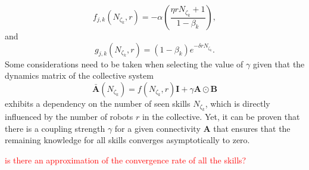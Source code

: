\begin{equation}\label{eq:f_function_collective}
	f_{j,k}\left(N_{\zeta_k},r\right) = -\alpha \left( \frac{\eta r N_{\zeta_k} + 1}{1 - \beta_k} \right),
\end{equation}
and
\begin{equation}\label{eq:g_function_collective}
	g_{j,k}\left(N_{\zeta_k},r\right) = (1-\beta_k) e^{-\delta r N_{\zeta_k}}.
\end{equation}
Some considerations need to be taken when selecting the value of $\gamma$ given that the dynamics matrix of the collective system
\begin{equation}
	\bar{\bm{A}}\left(N_{\zeta_k}\right) = f\left(N_{\zeta_k},r\right) \bm{I} + \gamma \bm{A} \odot \bm{B} 
\end{equation} 
exhibits a dependency on the number of seen skills $N_{\zeta_k}$, which is directly influenced by the number of robots $r$ in the collective. Yet, it can be proven that there is a coupling strength $\gamma$ for a given connectivity $\bm{A}$ that ensures that the remaining knowledge for all skills converges asymptotically to zero.

\TODO \textcolor{red}{is there an approximation of the convergence rate of all the skills?}




